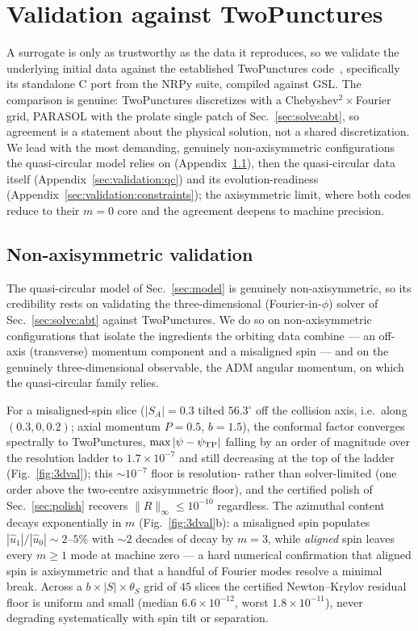 \documentclass[
  aps,
  prd,
  twocolumn,
  amsmath,
  amssymb,
  nofootinbib,
  superscriptaddress,
  floatfix,
]{revtex4-2}
\begin{document}
\section{Validation against TwoPunctures}
\label{sec:validation}
A surrogate is only as trustworthy as the data it reproduces, so we validate the
underlying initial data against the established TwoPunctures code~\cite{AnsorgBruegmannTichy2004}, specifically its standalone C port from the NRPy
suite, compiled against GSL.
The comparison is genuine: TwoPunctures discretizes with a
Chebyshev$^2\times$Fourier grid, PARASOL with the prolate single patch of
Sec.~\ref{sec:solve:abt}, so agreement is a statement about the physical solution,
not a shared discretization. We lead with the most demanding, genuinely
non-axisymmetric configurations the quasi-circular model relies on
(Appendix~\ref{sec:validation:3d}), then the quasi-circular data itself
(Appendix~\ref{sec:validation:qc}) and its evolution-readiness
(Appendix~\ref{sec:validation:constraints}); the axisymmetric limit, where both codes
reduce to their $m=0$ core and the agreement deepens to machine precision.


\subsection{Non-axisymmetric validation}
\label{sec:validation:3d}

The quasi-circular model of Sec.~\ref{sec:model} is genuinely non-axisymmetric, so
its credibility rests on validating the three-dimensional (Fourier-in-$\phi$)
solver of Sec.~\ref{sec:solve:abt} against TwoPunctures. We do so on
non-axisymmetric configurations that isolate the ingredients the orbiting data
combine --- an off-axis (transverse) momentum component and a misaligned spin ---
and on the genuinely three-dimensional observable, the ADM angular momentum, on
which the quasi-circular family relies.

For a misaligned-spin slice ($|S_A|=0.3$ tilted $56.3^\circ$ off the collision
axis, i.e.\ along $(0.3,0,0.2)$; axial momentum $P=0.5$, $b=1.5$), the conformal
factor converges spectrally to TwoPunctures, $\max|\psi-\psi_{\rm TP}|$ falling by
an order of magnitude over the resolution ladder to $1.7\times10^{-7}$ and still
decreasing at the top of the ladder (Fig.~\ref{fig:3dval}); this $\sim\!10^{-7}$
floor is resolution- rather than solver-limited (one order above the two-centre
axisymmetric floor), and the certified polish of Sec.~\ref{sec:polish} recovers
$\|R\|_\infty\le10^{-10}$ regardless. The azimuthal content decays exponentially in
$m$ (Fig.~\ref{fig:3dval}b): a misaligned spin populates
$|\hat u_1|/|\hat u_0|\sim2$--$5\%$ with $\sim\!2$ decades of decay by $m=3$, while
\emph{aligned} spin leaves every $m\!\ge\!1$ mode at machine zero --- a hard
numerical confirmation that aligned spin is axisymmetric and that a handful of
Fourier modes resolve a minimal break. Across a $b\times|S|\times\theta_S$ grid of
$45$ slices the certified Newton--Krylov residual floor is uniform and small
(median $6.6\times10^{-12}$, worst $1.8\times10^{-11}$), never degrading
systematically with spin tilt or separation.
\end{document}
